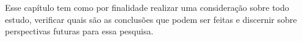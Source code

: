 Esse capítulo tem como por finalidade realizar uma consideração sobre todo estudo, verificar quais são as conclusões que podem ser feitas e discernir sobre perspectivas futuras para essa pesquisa.